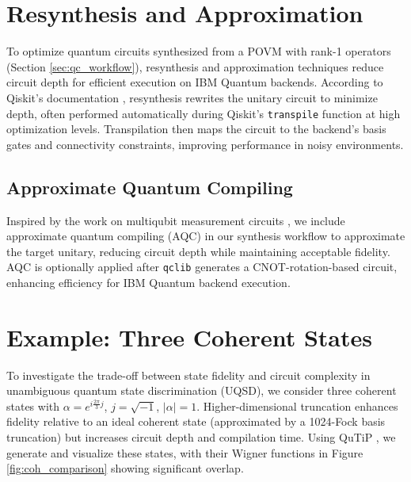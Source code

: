 \section{Resynthesis and Approximation}
\label{sec:resynth}

To optimize quantum circuits synthesized from a POVM with rank-1 operators
(Section \ref{sec:qc_workflow}), resynthesis and approximation techniques
reduce circuit depth for efficient execution on IBM Quantum backends.
According to Qiskit’s documentation \cite{ibmSynthesizeUnitary}, resynthesis
rewrites the unitary circuit to minimize depth, often performed automatically
during Qiskit’s \texttt{transpile} function at high optimization levels.
Transpilation then maps the circuit to the backend’s basis gates and
connectivity constraints, improving performance in noisy environments.

\subsection{Approximate Quantum Compiling}
Inspired by the work on multiqubit measurement circuits \cite{dc_gm}, we
include approximate quantum compiling (AQC) in our synthesis workflow to
approximate the target unitary, reducing circuit depth while maintaining
acceptable fidelity.
AQC is optionally applied after \texttt{qclib} generates a CNOT-rotation-based
circuit, enhancing efficiency for IBM Quantum backend execution.

\section{Example: Three Coherent States}
\label{sec:coherent_example}

To investigate the trade-off between state fidelity and circuit complexity in
unambiguous quantum state discrimination (UQSD), we consider three coherent
states with \(\alpha = e^{i \frac{2\pi}{3} j}\), \(j = \sqrt{-1}\), \(|\alpha| = 1\).
Higher-dimensional truncation enhances fidelity relative to an ideal coherent
state (approximated by a 1024-Fock basis truncation) but increases circuit
depth and compilation time.
Using QuTiP \cite{lambert2024qutip5quantumtoolbox}, we generate and visualize
these states, with their Wigner functions in Figure \ref{fig:coh_comparison}
showing significant overlap.



